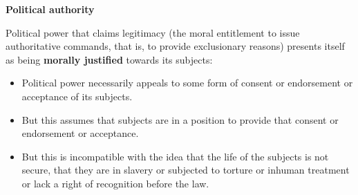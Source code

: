 \textbf{Political authority}

Political power that claims legitimacy (the moral entitlement to issue
authoritative commands, that is, to provide exclusionary reasons) presents
itself as being \textbf{morally justified} towards its subjects:

\begin{itemize}
    \item Political power necessarily appeals to some form of consent
    or endorsement or acceptance of its subjects.
    \item But this assumes that subjects are in a position to provide that
    consent or endorsement or acceptance.
    \item But this is incompatible with the idea that the life of the
    subjects is not secure, that they are in slavery or subjected to torture
    or inhuman treatment or lack a right of recognition before the law.
\end{itemize}

